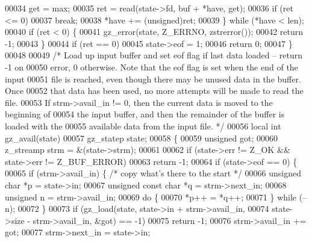 \begin{DoxyCode}
00034             \textcolor{keyword}{get} = max;
00035         ret = read(state->fd, buf + *have, \textcolor{keyword}{get});
00036         \textcolor{keywordflow}{if} (ret <= 0)
00037             \textcolor{keywordflow}{break};
00038         *have += (unsigned)ret;
00039     \} \textcolor{keywordflow}{while} (*have < len);
00040     \textcolor{keywordflow}{if} (ret < 0) \{
00041         gz\_error(state, Z\_ERRNO, zstrerror());
00042         \textcolor{keywordflow}{return} -1;
00043     \}
00044     \textcolor{keywordflow}{if} (ret == 0)
00045         state->eof = 1;
00046     \textcolor{keywordflow}{return} 0;
00047 \}
00048 
00049 \textcolor{comment}{/* Load up input buffer and set eof flag if last data loaded -- return -1 on}
00050 \textcolor{comment}{   error, 0 otherwise.  Note that the eof flag is set when the end of the input}
00051 \textcolor{comment}{   file is reached, even though there may be unused data in the buffer.  Once}
00052 \textcolor{comment}{   that data has been used, no more attempts will be made to read the file.}
00053 \textcolor{comment}{   If strm->avail\_in != 0, then the current data is moved to the beginning of}
00054 \textcolor{comment}{   the input buffer, and then the remainder of the buffer is loaded with the}
00055 \textcolor{comment}{   available data from the input file. */}
00056 local \textcolor{keywordtype}{int} gz\_avail(state)
00057     gz\_statep state;
00058 \{
00059     \textcolor{keywordtype}{unsigned} got;
00060     z\_streamp strm = &(state->strm);
00061 
00062     \textcolor{keywordflow}{if} (state->err != Z\_OK && state->err != Z\_BUF\_ERROR)
00063         \textcolor{keywordflow}{return} -1;
00064     \textcolor{keywordflow}{if} (state->eof == 0) \{
00065         \textcolor{keywordflow}{if} (strm->avail\_in) \{       \textcolor{comment}{/* copy what's there to the start */}
00066             \textcolor{keywordtype}{unsigned} \textcolor{keywordtype}{char} *p = state->in;
00067             \textcolor{keywordtype}{unsigned} \textcolor{keyword}{const} \textcolor{keywordtype}{char} *q = strm->next\_in;
00068             \textcolor{keywordtype}{unsigned} n = strm->avail\_in;
00069             \textcolor{keywordflow}{do} \{
00070                 *p++ = *q++;
00071             \} \textcolor{keywordflow}{while} (--n);
00072         \}
00073         \textcolor{keywordflow}{if} (gz\_load(state, state->in + strm->avail\_in,
00074                     state->size - strm->avail\_in, &got) == -1)
00075             \textcolor{keywordflow}{return} -1;
00076         strm->avail\_in += got;
00077         strm->next\_in = state->in;

\end{DoxyCode}
